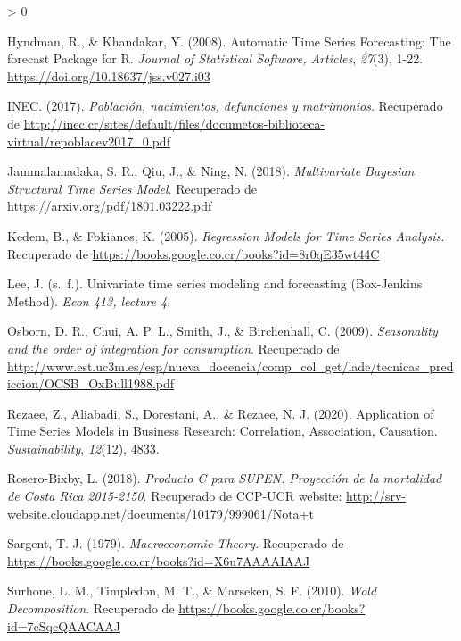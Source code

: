 \documentclass[
]{article}
\newlength{\cslhangindent}
\newenvironment{CSLReferences}[2] %
 {%
  \setlength{\parindent}{0pt}
  \ifodd #1 \everypar{\setlength{\hangindent}{\cslhangindent}}\ignorespaces\fi
  \ifnum #2 > 0
  \setlength{\parskip}{#2\baselineskip}
  \fi
 }%
 {}
\begin{document}
\begin{CSLReferences}{1}{0}
\leavevmode\hypertarget{ref-auto.arima}{}%
Hyndman, R., \& Khandakar, Y. (2008). Automatic Time Series Forecasting:
The forecast Package for R. \emph{Journal of Statistical Software,
Articles}, \emph{27}(3), 1-22.
\url{https://doi.org/10.18637/jss.v027.i03}

\leavevmode\hypertarget{ref-calidad_vitales}{}%
INEC. (2017). \emph{Población, nacimientos, defunciones y matrimonios}.
Recuperado de
\url{http://inec.cr/sites/default/files/documetos-biblioteca-virtual/repoblacev2017_0.pdf}

\leavevmode\hypertarget{ref-bayes}{}%
Jammalamadaka, S. R., Qiu, J., \& Ning, N. (2018). \emph{Multivariate
Bayesian Structural Time Series Model}. Recuperado de
\url{https://arxiv.org/pdf/1801.03222.pdf}

\leavevmode\hypertarget{ref-kedem}{}%
Kedem, B., \& Fokianos, K. (2005). \emph{Regression Models for Time
Series Analysis}. Recuperado de
\url{https://books.google.co.cr/books?id=8r0qE35wt44C}

\leavevmode\hypertarget{ref-Lee}{}%
Lee, J. (s.~f.). Univariate time series modeling and forecasting
(Box-Jenkins Method). \emph{Econ 413, lecture 4}.

\leavevmode\hypertarget{ref-Osborn2009SEASONALITYAT}{}%
Osborn, D. R., Chui, A. P. L., Smith, J., \& Birchenhall, C. (2009).
\emph{Seasonality and the order of integration for consumption}.
Recuperado de
\url{http://www.est.uc3m.es/esp/nueva_docencia/comp_col_get/lade/tecnicas_prediccion/OCSB_OxBull1988.pdf}

\leavevmode\hypertarget{ref-tsa_decision_making}{}%
Rezaee, Z., Aliabadi, S., Dorestani, A., \& Rezaee, N. J. (2020).
Application of Time Series Models in Business Research: Correlation,
Association, Causation. \emph{Sustainability}, \emph{12}(12), 4833.

\leavevmode\hypertarget{ref-supenprodc}{}%
Rosero-Bixby, L. (2018). \emph{Producto C para SUPEN. Proyección de la
mortalidad de Costa Rica 2015-2150}. Recuperado de CCP-UCR website:
\url{http://srv-website.cloudapp.net/documents/10179/999061/Nota+t}

\leavevmode\hypertarget{ref-sargent_macro}{}%
Sargent, T. J. (1979). \emph{Macroeconomic Theory}. Recuperado de
\url{https://books.google.co.cr/books?id=X6u7AAAAIAAJ}

\leavevmode\hypertarget{ref-Wold}{}%
Surhone, L. M., Timpledon, M. T., \& Marseken, S. F. (2010). \emph{Wold
Decomposition}. Recuperado de
\url{https://books.google.co.cr/books?id=7cSqcQAACAAJ}


\end{CSLReferences}
\end{document}
